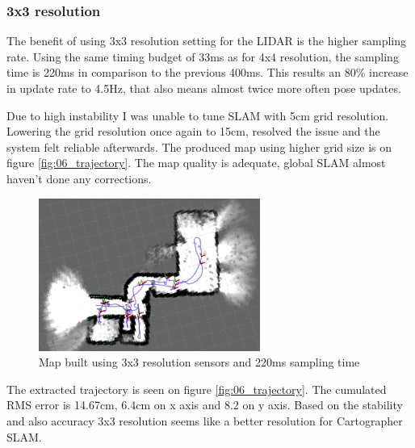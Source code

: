 \subsubsection{3x3 resolution}
The benefit of using 3x3 resolution setting for the LIDAR is the higher sampling rate. Using the 
same timing budget of 33ms as for 4x4 resolution, the sampling time is 220ms in comparison to the 
previous 400ms. This results an 80\% increase in update rate to 4.5Hz, that also means almost twice
more often pose updates.

Due to high instability I was unable to tune SLAM with 5cm grid resolution. Lowering the grid 
resolution once again to 15cm, resolved the issue and the system felt reliable afterwards. The 
produced map using higher grid size is on figure \ref{fig:06_trajectory}. The map quality is
adequate, global SLAM almost haven't done any corrections.


\begin{figure}[!h]
    \centering
	\includegraphics[height=50mm, keepaspectratio]{figures/06_map.png}
    \caption{Map built using 3x3 resolution sensors and 220ms sampling time}
    \label{fig:06_map}
\end{figure}

The extracted trajectory is seen on figure \ref{fig:06_trajectory}. The cumulated RMS error is 
14.67cm, 6.4cm on x axis and 8.2 on y axis. Based on the stability and also accuracy 3x3 resolution
seems like a better resolution for Cartographer SLAM. 

